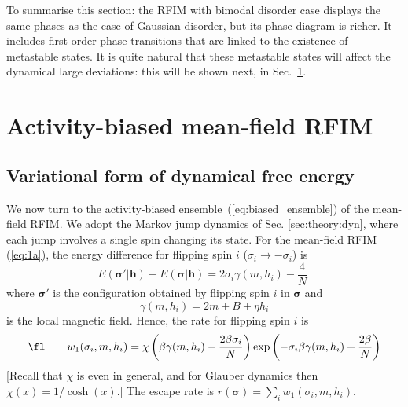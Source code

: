 \documentclass{iopart}
\newcommand{\eqref}[1]{(\ref{#1})}
\begin{document}
To summarise this section: 
the RFIM with bimodal disorder case displays the same phases as the case of Gaussian disorder, but its phase diagram is richer.  It includes first-order phase transitions that are linked to the existence of metastable states.  
It is quite natural that these metastable states will affect the dynamical large deviations: this will be shown next, in Sec.~\ref{sec:s_ens_RFIM}.


\section{Activity-biased mean-field RFIM}
\label{sec:s_ens_RFIM}

\subsection{Variational form of dynamical free energy}

We now turn to the activity-biased ensemble~\eqref{eq:biased_ensemble} of the mean-field RFIM. 
We adopt the Markov jump dynamics of Sec. \ref{sec:theory:dyn}, where each jump involves a single spin changing its state.
For the mean-field RFIM \eqref{eq:1a}, 
the energy difference for flipping spin $i$ ($\sigma_{i} \to -\sigma_{i}$) is
\begin{equation}
  \label{eq:9}
    E(\bm{\sigma}'|\bm{h}) - E(\bm{\sigma}|\bm{h})   = 2\sigma_{i} \gamma(m,h_i)  - \frac{4}{N} \, \, 
  \end{equation}
where $\bm{\sigma}'$ is the configuration obtained by flipping spin $i$ in $\bm{\sigma}$
and 
\begin{equation}
\gamma(m,h_i) = 2m + B + \eta h_i
\end{equation}
is the local magnetic field.  Hence, the rate for flipping spin $i$ is
\begin{equation}
\label{equ:w1}
\fl\qquad
w_1(\sigma_i,m,h_i) = \chi\left( \beta\gamma(m,h_i) -\frac{2\beta\sigma_i}{N} \right) \exp\left( -\sigma_i \beta \gamma(m,h_i) + \frac{2\beta }{N} \right)
\end{equation}
[Recall that $\chi$ is even in general, and for Glauber dynamics then $\chi(x) = 1/\cosh(x)$.]
The escape rate is $r(\bm{\sigma}) = \sum_i w_1(\sigma_i,m,h_i)$.  
\end{document}
